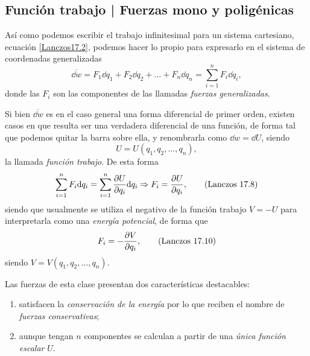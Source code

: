 \documentclass[12pt, spanish, a4paper, ]{article}
\begin{document}
\subsection{Función trabajo | Fuerzas mono y poligénicas}\label{funcionTrabajo}
Así como podemos escribir el trabajo infinitesimal para un sistema cartesiano, ecuación \eqref{Lanczos17.2}, podemos hacer lo propio para expresarlo en el sistema de coordenadas generalizadas
\begin{equation}\label{Lanczos17.3}
	\overline{\dd w}= F_1 \dd q_1+ F_2 \dd q_2+ \ldots + F_n \dd q_n=  \displaystyle\sum_{i=1}^{n} F_{i} \dd q_i,
	\tag{Lanczos 17.3}
\end{equation}
donde las \(F_i\) son las componentes de las llamadas \emph{fuerzas generalizadas}.

Si bien \(\overline{\dd w}\) es en el caso general una forma diferencial de primer orden, existen casos en que resulta ser una verdadera diferencial de una función, de forma tal que podemos quitar la barra sobre ella, y renombrarla como \(\dd w= \dd U\), siendo
\begin{equation}\label{Lanczos17.6}
	U= U(q_1, q_2, \ldots, q_n),
	\tag{Lanczos 17.6}
\end{equation}
la llamada \emph{función trabajo}.
De esta forma
\begin{equation}\label{Lanczos17.8}
	\sum_{i=1}^{n} F_i \dd q_i = \sum_{i=1}^{n} \pdv{U}{q_i} \dd q_i 
	\Rightarrow F_i = \pdv{U}{q_i},
	\tag{Lanczos 17.8}
\end{equation}
siendo que usualmente se utiliza el negativo de la función trabajo \(V= - U\) para interpretarla como una \emph{energía potencial}, de forma que 
\begin{align}\label{Lanczos17.10}
	F_i= - \pdv{V}{q_i},
	\tag{Lanczos 17.10}
\end{align}
siendo \(V= V(q_1, q_2, \ldots, q_n)\).

Las fuerzas de esta clase presentan dos características destacables:
\begin{enumerate}
	\item satisfacen la \emph{conservación de la energía} por lo que reciben el nombre de \emph{fuerzas conservativas};
	\item aunque tengan \(n\) componentes se calculan a partir de una \emph{única función escalar} \(U\).
\end{enumerate}
\end{document}
